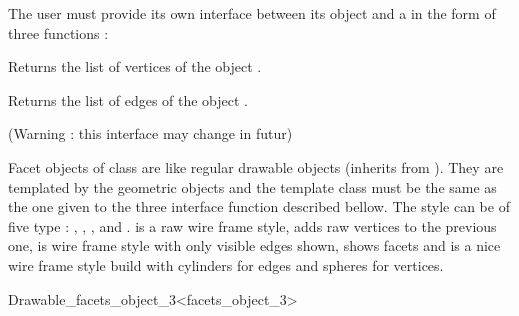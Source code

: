 The user must provide its own interface between its object and a
 in the form of three functions :

\ccThreeToTwo
{} {Returns the list of vertices
of the object .}

 {Returns the list of edges of the object .}


(Warning : this interface may change in futur)

Facet objects of class  are like regular
drawable objects (inherits from ). They are templated by
the geometric objects and the template class must be the same as the
one given to the three interface function described bellow. The style
can be of five type : , , ,  and .  is a raw
wire frame style,  adds raw vertices to the previous one,  is
wire frame style with only visible edges shown,  shows facets and
 is a nice wire frame style build with cylinders for edges and
spheres for vertices. 

\begin{ccClassTemplate}{Drawable_facets_object_3<facets_object_3>}
\end{ccClassTemplate}

